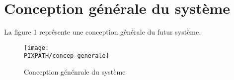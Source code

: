 
\section{Conception générale du système}

La figure 1 représente une conception générale du futur système.
\begin{figure}
\begin{center}
    \texttt{[image: \\PIXPATH/concep\_generale]}
\end{center}
\caption{Conception génénrale du système}
\end{figure}

